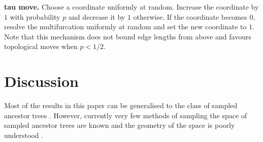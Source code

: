 \documentclass{amsart}
\begin{document}
{\bf tau move.}
Choose a coordinate uniformly at random.
Increase the coordinate by $1$ with probability $p$ and decrease it by $1$ otherwise.
If the coordinate becomes $0$, resolve the multifurcation uniformly at random and set the new coordinate to $1$.
Note that this mechanism does not bound edge lengths from above and favours topological moves when $p<1/2$.


\section{Discussion}
Most of the results in this paper can be generalised to the class of sampled ancestor trees \autocite{Gavryushkina2014-xd}.
However, currently very few methods of sampling the space of sampled ancestor trees are known \autocite{Gavryushkina2015-vq} and the geometry of the space is poorly understood \autocite{Gavryushkin2014-bw}.

%
%

\printbibliography
\end{document}
